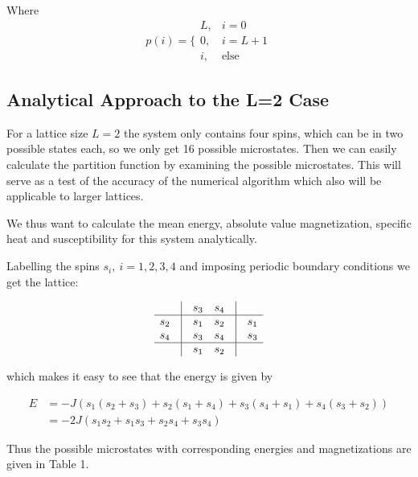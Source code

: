 \documentclass[english, 12pt]{article}
\begin{document}
Where
$$p(i) = \Bigg\{ \begin{matrix}
L, & i=0 \\ 0, & i=L+1 \\  i, & \text{else} \end{matrix}$$

\subsection{Analytical Approach to the L=2 Case}
For a lattice size $L=2$ the system only contains four spins, which can be in two possible states each, so we only get 16 possible microstates. Then we can easily calculate the partition function by examining the possible microstates. This will serve as a test of the accuracy of the numerical algorithm which also will be applicable to larger lattices.

We thus want to calculate the mean energy, absolute value magnetization, specific heat and susceptibility for this system analytically.

Labelling the spins $s_i,\ i= 1,2,3,4 $ and imposing periodic boundary conditions we get the lattice:

$$\begin{matrix} & \vline & s_3  & s_4 & \vline & \\ \hline
s_2 & \vline & s_1 & s_2 & \vline & s_1 \\
s_4 & \vline & s_3 & s_4 & \vline & s_3 \\ \hline
 & \vline & s_1 & s_2 & \vline & \end{matrix} $$

which makes it easy to see that the energy is given by

\begin{align*}
E &= -J(s_1(s_2+s_3) + s_2(s_1+s_4) + s_3(s_4+s_1) + s_4(s_3+s_2))\\
&= -2J(s_1s_2 + s_1s_3+s_2s_4+s_3s_4)
\end{align*}

Thus the possible microstates with corresponding energies and magnetizations are given in Table 1.
\end{document}
